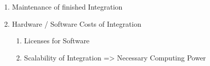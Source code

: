 \documentclass[
     12pt,         %
     a4paper,      %
     BCOR10mm,     %
     DIV14,        %
     ]{scrreprt}
\begin{document}
\begin{enumerate}
\begin{enumerate}
                \item Maintenance of finished Integration

                \item Hardware / Software Costs of Integration
                      \begin{enumerate}
                           \item Licenses for Software
                           \item Scalability of Integration => Necessary Computing Power
                      \end{enumerate}

           \end{enumerate}

\end{enumerate}
\end{document}
